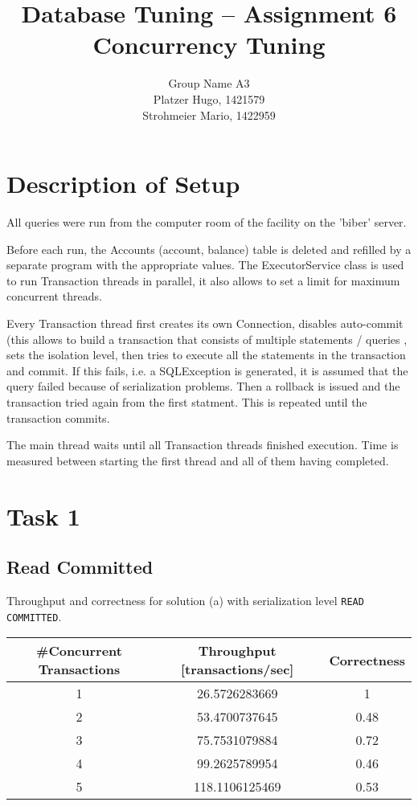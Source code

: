 \documentclass[11pt]{scrartcl}
\title{
  \textbf{\large Database Tuning -- Assignment 6}\\
  Concurrency Tuning
}
\author{
 Group Name A3\\
 \large Platzer Hugo, 1421579 \\
 \large Strohmeier Mario, 1422959
}
\begin{document}
\maketitle

\section{Description of Setup}
All queries were run from the computer room of the facility on the 'biber' server.

Before each run, the Accounts (account, balance) table is deleted and refilled
by a separate program with the appropriate values.
The ExecutorService class is used to run Transaction threads in parallel, it 
also allows to set a limit for maximum concurrent threads.

Every Transaction thread first creates its own Connection, disables auto-commit (this allows
to build a transaction that consists of multiple statements / queries
, sets the isolation level,
then tries to execute all the statements in the transaction and commit. If this fails, i.e. a SQLException
is generated, it is assumed that the query failed because of serialization problems. Then a rollback is issued
and the transaction tried again from the first statment. This is repeated until the transaction commits.

The main thread waits until all Transaction threads finished execution. Time is measured between
starting the first thread and all of them having completed.

\section*{Task 1}

\subsection*{Read Committed}

Throughput and correctness for solution (a) with serialization level
{\tt\small READ COMMITTED}.

\bigskip

\begin{tabular}{c|c|c}
  \#Concurrent Transactions & Throughput [transactions/sec] & Correctness
  \\\hline
  1 & 26.5726283669 & 1\\
  2 & 53.4700737645 & 0.48\\
  3 & 75.7531079884 & 0.72\\
  4 & 99.2625789954 & 0.46\\
  5 & 118.1106125469 & 0.53\\    
\end{tabular}
\end{document}
